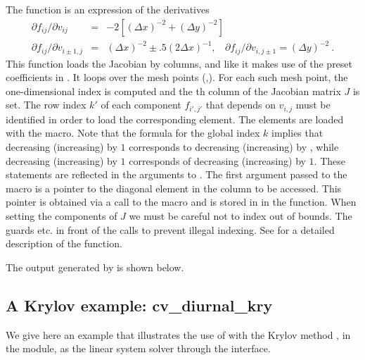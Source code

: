 The  function is an expression of the derivatives
\vspace*{-.08in}
\begin{eqnarray*}
\partial f_{ij} / \partial v_{ij} &=&
         -2 [(\Delta x)^{-2} + (\Delta y)^{-2}] \\
\partial f_{ij} / \partial v_{i \pm 1,j} &=& (\Delta x)^{-2} 
                  \pm .5 (2 \Delta x)^{-1}, ~~~~
\partial f_{ij} / \partial v_{i,j \pm 1}  =  (\Delta y)^{-2} ~. 
\end{eqnarray*}
This function loads the Jacobian by columns, and like  it
makes use of the preset coefficients in .
It loops over the mesh points (,). For each such mesh
point, the one-dimensional index  is computed
and the th column of the Jacobian matrix $J$ is set. 
The row index $k'$ of each component $f_{i',j'}$ that depends on
$v_{i,j}$ must be identified in order to load the corresponding element.
The elements are loaded with the  macro.
Note that the formula for the global index $k$ implies that decreasing 
(increasing)  by $1$ corresponds to decreasing (increasing) 
 by , while decreasing (increasing)  by $1$ 
corresponds of decreasing (increasing)  by $1$. 
These statements are reflected in the arguments to
.  The first argument passed to the
 macro is a pointer to the diagonal element
in the column to be accessed. This pointer is obtained via a call to
the  macro and is stored in  in 
the  function. When setting the components of $J$ we must be
careful not to index out of bounds. The guards  etc.
in front of the calls to  prevent illegal
indexing. See  for a detailed description of the
 function.

The output generated by  is shown below.



\subsection{A Krylov example: cv\_diurnal\_kry}\label{ss:cv_diurnal}

We give here an example that illustrates the use of {\cvode} with the Krylov
method {\spgmr}, in the {\sunlinsolspgmr} module, as the linear system
solver through the {\cvls} interface.

